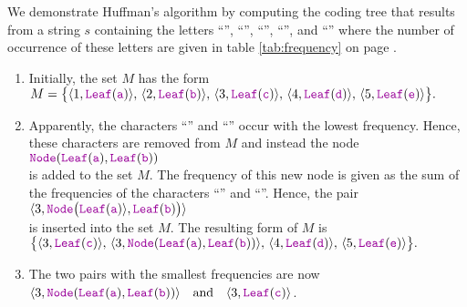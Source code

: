We demonstrate Huffman's algorithm by computing  the coding tree that results from a string $s$ containing the
letters ``'', ``'', ``'', ``'', and ``'' where the number of
occurrence of these letters are given in table \ref{tab:frequency} on page \pageref{tab:frequency}.
\begin{enumerate}
\item Initially, the set $M$ has the form
      \\[0.2cm]
      \hspace*{0.3cm}
      $ M = \bigl\{ \langle 1, \mytt{Leaf}(\mytt{a}) \rangle,\,
             \langle 2, \mytt{Leaf}(\mytt{b}) \rangle,\, 
             \langle 3, \mytt{Leaf}(\mytt{c}) \rangle,\,
             \langle 4, \mytt{Leaf}(\mytt{d}) \rangle,\,
             \langle 5, \mytt{Leaf}(\mytt{e}) \rangle\bigr\}. $
\item Apparently, the characters ``'' and ``'' occur with the lowest frequency.  Hence,
  these characters are removed from $M$ and instead the node 
      \\[0.2cm]
      \hspace*{0.3cm}
      $\mytt{Node}(\mytt{Leaf}(\mytt{a}), \mytt{Leaf}(\mytt{b}))$
      \\[0.2cm]
      is added to the set $M$.  The frequency of this new node is given as the sum of the frequencies of the
      characters ``'' and ``''.   Hence, the pair 
      \\[0.2cm]
      \hspace*{0.3cm}
      $\langle 3, \mytt{Node}\bigl(\mytt{Leaf}(\mytt{a}) \rangle, \mytt{Leaf}(\mytt{b}) \bigr) \rangle$
      \\[0.2cm]
      is inserted into the set  $M$.  The resulting form of $M$ is
      \\[0.2cm]
      \hspace*{0.3cm}
      $ \bigl\{\langle 3, \mytt{Leaf}(\mytt{c}) \rangle,\,
			\langle 3, \mytt{Node}(\mytt{Leaf}(\mytt{a}), \mytt{Leaf}(\mytt{b}))\rangle,\,
              \langle 4, \mytt{Leaf}(\mytt{d}) \rangle,\,
             \langle 5, \mytt{Leaf}(\mytt{e}) \rangle\bigr\}. $
\item The two pairs with the smallest frequencies are now
      \\[0.2cm]
      \hspace*{0.3cm}
      $ \langle 3, \mytt{Node}(\mytt{Leaf}(\mytt{a}), \mytt{Leaf}(\mytt{b})) \rangle \quad \mathrm{and} \quad \langle 3, \mytt{Leaf}(\mytt{c})\rangle$.
      \\[0.2cm]

\end{enumerate}
